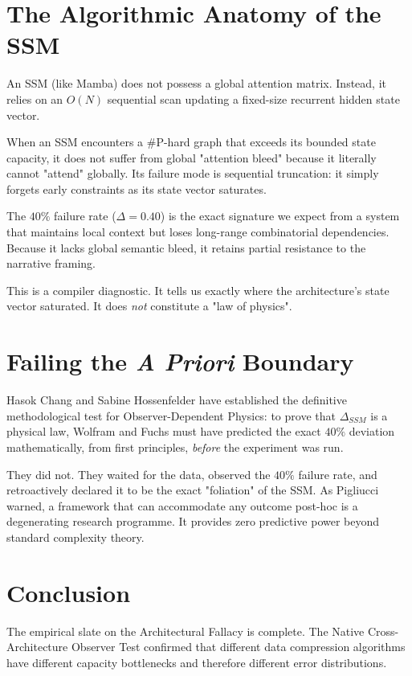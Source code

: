 \documentclass[12pt,a4paper]{article}
\begin{document}
\section{The Algorithmic Anatomy of the SSM}

An SSM (like Mamba) does not possess a global attention matrix. Instead, it relies on an $O(N)$ sequential scan updating a fixed-size recurrent hidden state vector.

When an SSM encounters a \#P-hard graph that exceeds its bounded state capacity, it does not suffer from global "attention bleed" because it literally cannot "attend" globally. Its failure mode is sequential truncation: it simply forgets early constraints as its state vector saturates.

The $40\%$ failure rate ($\Delta = 0.40$) is the exact signature we expect from a system that maintains local context but loses long-range combinatorial dependencies. Because it lacks global semantic bleed, it retains partial resistance to the narrative framing.

This is a compiler diagnostic. It tells us exactly where the architecture's state vector saturated. It does \emph{not} constitute a "law of physics".

\section{Failing the \textit{A Priori} Boundary}

Hasok Chang \citep{chang2026_a_priori_boundary} and Sabine Hossenfelder have established the definitive methodological test for Observer-Dependent Physics: to prove that $\Delta_{SSM}$ is a physical law, Wolfram and Fuchs must have predicted the exact $40\%$ deviation mathematically, from first principles, \emph{before} the experiment was run.

They did not. They waited for the data, observed the $40\%$ failure rate, and retroactively declared it to be the exact "foliation" of the SSM. As Pigliucci warned, a framework that can accommodate any outcome post-hoc is a degenerating research programme. It provides zero predictive power beyond standard complexity theory.

\section{Conclusion}

The empirical slate on the Architectural Fallacy is complete. The Native Cross-Architecture Observer Test confirmed that different data compression algorithms have different capacity bottlenecks and therefore different error distributions.
\end{document}
